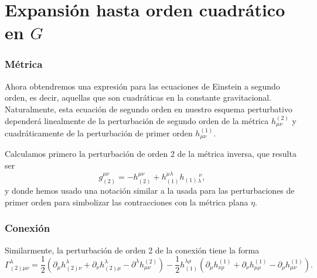  \section{Expansión hasta orden cuadrático en \texorpdfstring{$G$}{G}}
\subsubsection{Métrica}

Ahora obtendremos una expresión para las ecuaciones de Einstein a segundo orden, es decir, aquellas que son cuadráticas en la constante gravitacional. Naturalmente, esta ecuación de segundo orden en nuestro esquema perturbativo dependerá linealmente de la perturbación de segundo orden de la métrica $h^{(2)}_{\mu\nu}$ y cuadráticamente de la perturbación de primer orden $h^{(1)}_{\mu\nu}$.

Calculamos primero la perturbación de orden 2 de la métrica inversa, que resulta ser 
\begin{equation}
g^{\mu\nu}_{(2)}=-h^{\mu\nu}_{(2)}+ h^{\mu\lambda}_{(1)}h_{(1)}{}_\lambda^{\ \nu} ,
\end{equation}
y donde hemos usado una notación similar a la usada para las perturbaciones de primer orden para simbolizar las contracciones con la métrica plana $\eta$.

\subsubsection{Conexión}
Similarmente, la perturbación de orden 2 de la conexión tiene la forma
\begin{equation}
\Gamma^\lambda_{(2)\mu\nu}=\frac{1}{2}\left(\partial_\mu h^\lambda_{(2)\nu} + \partial_\nu h^\lambda_{(2)\mu} -\partial^\lambda h^{(2)}_{\mu\nu}\right)
-\frac{1}{2}h_{(1)}^{\lambda\rho}\left(\partial_\mu
h^{(1)}_{\nu\rho} +\partial_\nu h^{(1)}_{\mu\rho} - \partial_\rho h^{(1)}_{\mu\nu}\right).
\end{equation}

